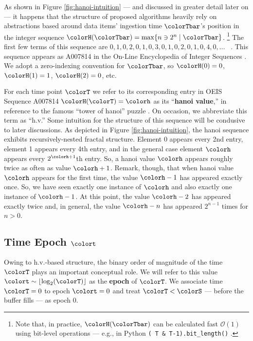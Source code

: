 As shown in Figure \ref{fig:hanoi-intuition} --- and discussed in greater detail later on --- it happens that the structure of proposed algorithms heavily rely on abstractions based around data items' ingestion time $\colorTbar$'s position in the integer sequence $\colorH(\colorTbar) = \max \{ n \ni 2^n \mid \colorTbar \}$.%
\footnote{%
Note that, in practice, $\colorH(\colorTbar)$ can be calculated fast $\mathcal{O}(1)$ using bit-level operations --- e.g., in Python \texttt{(~T \& T-1).bit\_length()} \citep{oeis}.
}
The first few terms of this sequence are $0,\allowbreak 1,\allowbreak 0,\allowbreak 2,\allowbreak 0,\allowbreak 1,\allowbreak 0,\allowbreak 3,\allowbreak 0,\allowbreak 1,\allowbreak 0,\allowbreak 2,\allowbreak 0,\allowbreak 1,\allowbreak 0,\allowbreak 4,\allowbreak 0,\allowbreak \ldots$ \, .
This sequence appears as A007814 in the On-Line Encyclopedia of Integer Sequences \citep{oeis}.
We adopt a zero-indexing convention for $\colorTbar$, so $\colorH(0) = 0$, $\colorH(1) = 1$, $\colorH(2) = 0$, etc.

For each time point $\colorT$ we refer to its corresponding entry in OEIS Sequence A007814 $\colorH(\colorT) = \colorh$ as its ``\textbf{hanoi value},'' in reference to the famous ``tower of hanoi'' puzzle \citep{lucas1889jeux}.
On occasion, we abbreviate this term as ``h.v.''
Some intuition for the structure of this sequence will be condusive to later discussions.
As depicted in Figure \ref{fig:hanoi-intuition}, the hanoi sequence exhibits recursively-nested fractal structure.
Element 0 appears every 2nd entry, element 1 appears every 4th entry, and in the general case element $\colorh$ appears every $2^{\colorh+1}$th entry.
So, a hanoi value $\colorh$ appears roughly twice as often as value $\colorh + 1$.
Remark, though, that when hanoi value $\colorh$ appears for the first time, the value $\colorh - 1$ has appeared exactly once.
So, we have seen exactly one instance of $\colorh$ and also exactly one instance of $\colorh - 1$.
At this point, the value $\colorh - 2$ has appeared exactly twice and, in general, the value $\colorh - n$ has appeared $2^{n - 1}$ times for $n > 0$.

\subsection{Time Epoch $\colort$}

Owing to h.v.-based structure, the binary order of magnitude of the time $\colorT$ plays an important conceptual role.
We will refer to this value $\colort \sim \left\lfloor \log_2(\colorT) \right\rfloor$ as the \textbf{epoch} of $\colorT$.
We associate time $\colorT=0$ to epoch $\colort=0$ and treat $\colorT < \colorS$ --- before the buffer fills --- as epoch 0.

